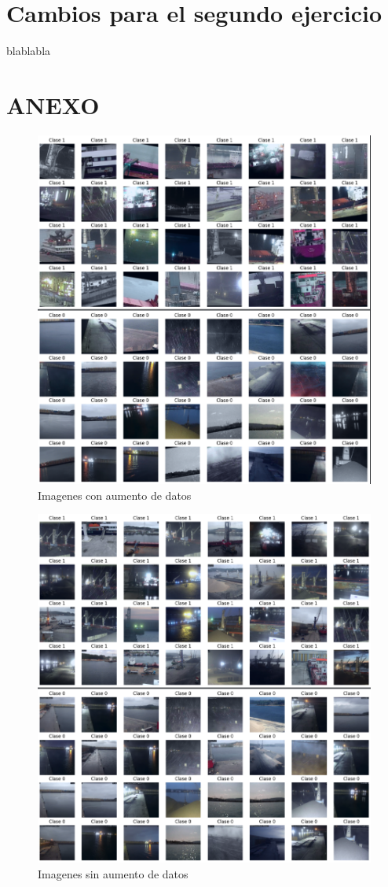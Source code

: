 \documentclass{article}
\begin{document}
\section*{Cambios para el segundo ejercicio}

blablabla

\section*{ANEXO}
	\begin{figure}[h]
	\centering
	\includegraphics[width=0.6\linewidth]{imagenesCon}
	\caption{Imagenes con aumento de datos}
	\label{fig:imagenescon}
\end{figure}

\begin{figure}[h]
	\centering
	\includegraphics[width=0.6\linewidth]{imagenesSin}
	\caption{Imagenes sin aumento de datos}
	\label{fig:imagenessin}
\end{figure}
\end{document}

